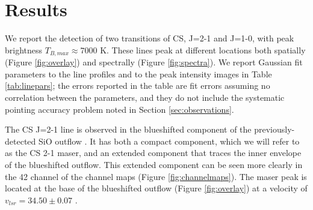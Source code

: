 \documentclass[twocolumn]{aastex62}
\begin{document}

\section{Results}
We report the detection of two transitions of CS, J=2-1 and J=1-0, with
peak brightness $T_{B,max}\approx7000$ K.
These lines peak at different locations both spatially (Figure
\ref{fig:overlay}) and spectrally (Figure \ref{fig:spectra}).
We report Gaussian fit parameters to the line profiles and to the peak intensity
images in Table \ref{tab:linepars}; the errors reported in the table are fit
errors assuming no correlation between the parameters, and they do not include
the systematic pointing accuracy problem noted in Section \ref{sec:observations}.

The CS J=2-1 line is observed in the blueshifted component of the
previously-detected SiO outflow \citep{Goddi2018a}.
It has both a compact component, which we will refer to as the CS 2-1 maser,
and an extended component that traces the inner envelope of the blueshifted
outflow.  This extended component can be seen more clearly in the 42 \kms
channel of the channel maps (Figure \ref{fig:channelmaps}).  The maser
peak is located at the base of the blueshifted outflow (Figure
\ref{fig:overlay}) at a velocity of $v_{lsr}=34.50\pm0.07$ \kms.
\end{document}
